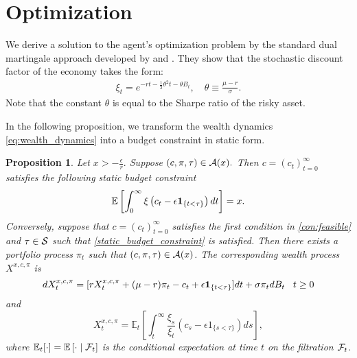 \documentclass[a4paper,report, 11pt]{article}
\newtheorem{pro}{Proposition}[section]
\def\half{\frac{1}{2}}
\def\e{\epsilon}
\def\m{\mu}
\def\s{\sigma}
\def\be{\begin{eqnarray}}
\def\ee{\end{eqnarray}}
\begin{document}
\section{Optimization}\label{sec:optimization}



We derive a solution to the agent's optimization problem by the standard dual martingale approach developed by \citet{KLS} and \citet{CoxH}. They show that the stochastic discount factor of the economy takes the form:
\be\label{stochastic_discount_factor}
{\xi}_t = e^{-rt-\half \theta ^2 t -\theta B_t}, \quad \theta \equiv \frac{\mu -r}{\s}.
\ee
Note that the constant $\theta$ is equal to the Sharpe ratio of the risky asset.  




In  
the following proposition, we  transform the wealth dynamics \eqref{eq:wealth_dynamics} into a budget constraint in static form. 

\begin{pro}\label{pro:budget-equaltiy}
	Let $x>-\frac{\e}{r}.$ Suppose $(c,\pi,\tau)\in {\cal A}(x).$ Then  $c=(c_t)_{t=0}^\infty$  satisfies the following static budget constraint 
	\begin{equation}\label{static_budget_constraint}
	\mathbb{E}\left[\int_0^\infty \xi\left(c_t-\e {\bf 1}_{\{t<\tau\}}\right)dt \right] =x.
	\end{equation}
Conversely, suppose that  $c=(c_t)_{t=0}^\infty$ satisfies the first condition in \eqref{con:feasible} and $\tau\in{\cal S}$ such that \eqref{static_budget_constraint} is satisfied. 	Then there exists a portfolio process $\pi_t$ such that $(c,\pi,\tau)\in {\cal A}(x)$. The corresponding wealth process $X^{x,c,\pi}$ is 
	\begin{equation*}
	dX_t^{x,c,\pi} = [r X_t^{x,c,\pi} +(\m-r)\pi_t -c_t +\e{\bf 1}_{\{t<\tau\}}]dt +\s \pi_t dB_t \;\;\;t\ge 0
	\end{equation*}
	and 
	\begin{equation}
	X_t^{x,c,\pi} =\mathbb{E}_t\left[\int_t^\infty \dfrac{ \xi_s}{ \xi_t} (c_s-\e 1_{\{s<\tau \}})ds\right],
	\end{equation}
	where $\mathbb{E}_t[\cdot]=\mathbb{E}\left[\cdot \mid {\cal F}_t\right]$ is the conditional expectation at time $t$ on the filtration ${\cal F}_t$. 
\end{pro}
\end{document}
